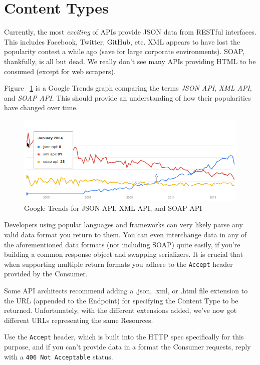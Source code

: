 \documentclass{book}
\begin{document}
\section{Content Types}

Currently, the most \emph{exciting} of APIs provide JSON data from RESTful interfaces. This includes Facebook, Twitter, GitHub, etc. XML appears to have lost the popularity contest a while ago (save for large corporate environments). SOAP, thankfully, is all but dead. We really don't see many APIs providing HTML to be consumed (except for web scrapers).

Figure ~\ref{fig:googletrends} is a Google Trends graph comparing the terms \emph{JSON API}, \emph{XML API}, and \emph{SOAP API}. This should provide an understanding of how their popularities have changed over time.

\begin{figure}[ht!]
\centering
\includegraphics[width=140mm]{images/xml-vs-json-vs-soap-google-trends.png}
\caption{Google Trends for JSON API, XML API, and SOAP API}
\label{fig:googletrends}
\end{figure}

Developers using popular languages and frameworks can very likely parse any valid data format you return to them. You can even interchange data in any of the aforementioned data formats (not including SOAP) quite easily, if you're building a common response object and swapping serializers. It is crucial that when supporting multiple return formats you adhere to the \texttt{Accept} header provided by the Consumer.

Some API architects recommend adding a .json, .xml, or .html file extension to the URL (appended to the Endpoint) for specifying the Content Type to be returned. Unfortunately, with the different extensions added, we've now got different URLs representing the same Resources.

Use the \texttt{Accept} header, which is built into the HTTP spec specifically for this purpose, and if you can't provide data in a format the Consumer requests, reply with a \texttt{406 Not Acceptable} status.
\end{document}
